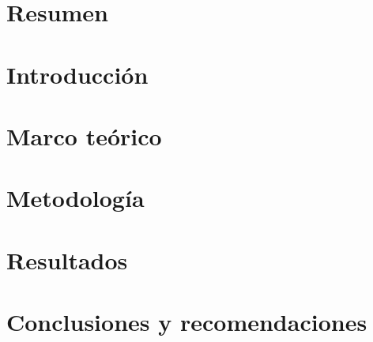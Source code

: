 \documentclass[12pt,letterpaper]{report}
\begin{document}

 
\tableofcontents
\listoffigures
\listoftables

\chapter*{Resumen}


\chapter*{Introducción}


\chapter{Marco teórico}


\chapter{Metodología}


\chapter{Resultados}


\chapter{Conclusiones y recomendaciones}


\printbibliography[title=Referencias]
\end{document}
